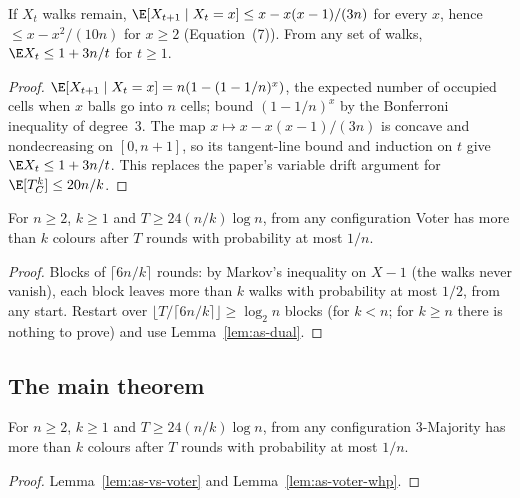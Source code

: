 \begin{lemma}\label{lem:as-walks}
\leanok
{}
If $X_t$ walks remain, $\E[X_{t+1}\mid X_t=x]\le x-x(x-1)/(3n)$ for every $x$, hence
$\le x-x^2/(10n)$ for $x\ge2$ (Equation~(7)). From any set of walks, $\E X_t\le1+3n/t$ for
$t\ge1$.
\end{lemma}
\begin{proof}\leanok
$\E[X_{t+1}\mid X_t=x]=n(1-(1-1/n)^x)$, the expected number of occupied cells when $x$ balls go
into $n$ cells; bound $(1-1/n)^x$ by the Bonferroni inequality of degree~3. The map
$x\mapsto x-x(x-1)/(3n)$ is concave and nondecreasing on $[0,n+1]$, so its tangent-line bound and
induction on $t$ give $\E X_t\le1+3n/t$. This replaces the paper's variable drift argument
for $\E[T^k_C]\le20n/k$.
\end{proof}

\begin{lemma}[Lemma~3]\label{lem:as-voter-whp}
\leanok{}
For $n\ge2$, $k\ge1$ and $T\ge24(n/k)\log n$, from any configuration Voter has more than $k$
colours after $T$ rounds with probability at most $1/n$.
\end{lemma}
\begin{proof}\leanok
Blocks of $\lceil6n/k\rceil$ rounds: by Markov's inequality on $X-1$ (the walks never vanish),
each block leaves more than $k$ walks with probability at most $1/2$, from any start. Restart
over $\lfloor T/\lceil6n/k\rceil\rfloor\ge\log_2 n$ blocks (for $k<n$; for $k\ge n$ there is
nothing to prove) and use Lemma~\ref{lem:as-dual}.
\end{proof}

\subsection{The main theorem}

\begin{lemma}[Phase~1]\label{lem:as-phase1}
\leanok{}
For $n\ge2$, $k\ge1$ and $T\ge24(n/k)\log n$, from any configuration 3-Majority has more than
$k$ colours after $T$ rounds with probability at most $1/n$.
\end{lemma}
\begin{proof}\leanok
Lemma~\ref{lem:as-vs-voter} and Lemma~\ref{lem:as-voter-whp}.
\end{proof}

